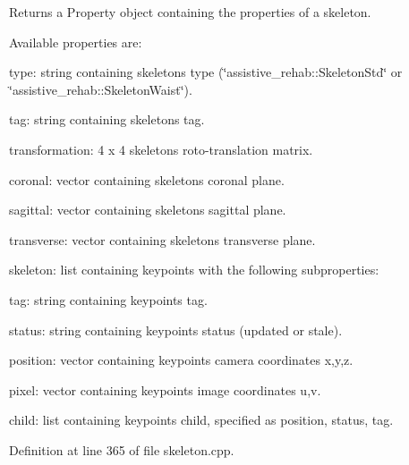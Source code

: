 \begin{DoxyReturn}{Returns}
a Property object containing the properties of a skeleton.
\end{DoxyReturn}
Available properties are\+:
\begin{DoxyItemize}
\item type\+: string containing skeleton\textquotesingle{}s type (\char`\"{}assistive\+\_\+rehab\+::\+Skeleton\+Std\char`\"{} or \char`\"{}assistive\+\_\+rehab\+::\+Skeleton\+Waist\char`\"{}).
\item tag\+: string containing skeleton\textquotesingle{}s tag.
\item transformation\+: 4 x 4 skeleton\textquotesingle{}s roto-\/translation matrix.
\item coronal\+: vector containing skeleton\textquotesingle{}s coronal plane.
\item sagittal\+: vector containing skeleton\textquotesingle{}s sagittal plane.
\item transverse\+: vector containing skeleton\textquotesingle{}s transverse plane.
\item skeleton\+: list containing keypoints with the following subproperties\+:
\begin{DoxyItemize}
\item tag\+: string containing keypoint\textquotesingle{}s tag.
\item status\+: string containing keypoint\textquotesingle{}s status (updated or stale).
\item position\+: vector containing keypoint\textquotesingle{}s camera coordinates x,y,z.
\item pixel\+: vector containing keypoint\textquotesingle{}s image coordinates u,v.
\item child\+: list containing keypoint\textquotesingle{}s child, specified as position, status, tag. 
\end{DoxyItemize}
\end{DoxyItemize}

Definition at line 365 of file skeleton.\+cpp.


